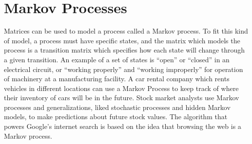 
\section{Markov Processes}

Matrices can be used to model a process called a Markov process. To fit this kind of model, a process must have specific states, and the matrix which models the process is a transition matrix which specifies how each state will change through a given transition. An example of a set of states is ``open'' or ``closed'' in an electrical circuit, or ``working properly'' and ``working improperly'' for operation of machinery at a manufacturing facility. A car rental company which rents vehicles in different locations can use a Markov Process to keep track of where their inventory of cars will be in the future. Stock market analysts use Markov processes and generalizations, liked stochastic processes and hidden Markov models, to make predictions about future stock values.  The algorithm that powers Google's internet search is based on the idea that browsing the web is a Markov process.

